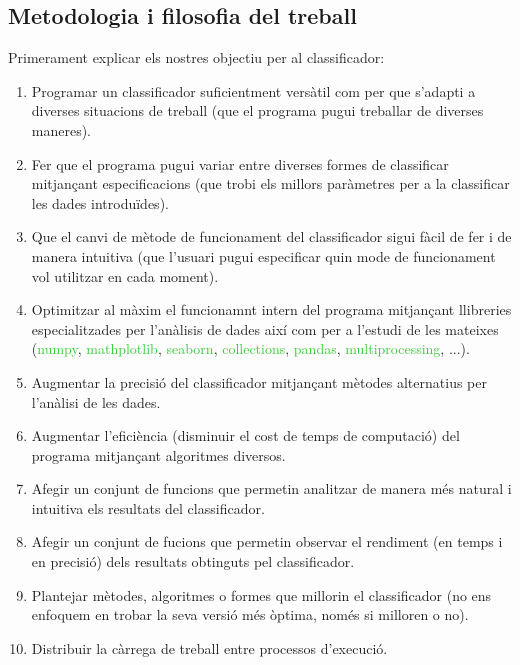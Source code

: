 \documentclass[a4paper, 11pt]{article}
\begin{document}
\subsection{Metodologia i filosofia del treball}
Primerament explicar els nostres objectiu per al classificador:
\begin{enumerate}
    \item Programar un classificador suficientment versàtil com per que s'adapti a diverses situacions de treball (que el programa pugui treballar de diverses maneres).
    \item Fer que el programa pugui variar entre diverses formes de classificar mitjançant especificacions (que trobi els millors paràmetres per a la classificar les dades introduïdes).
    \item Que el canvi de mètode de funcionament del classificador sigui fàcil de fer i de manera intuitiva (que l'usuari pugui especificar quin mode de funcionament vol utilitzar en cada moment).
    \item Optimitzar al màxim el funcionamnt intern del programa mitjançant llibreries especialitzades per l'anàlisis de dades així com per a l'estudi de les mateixes (\textcolor{LimeGreen}{numpy},  \textcolor{LimeGreen}{mathplotlib}, \textcolor{LimeGreen}{seaborn}, \textcolor{LimeGreen}{collections}, \textcolor{LimeGreen}{pandas}, \textcolor{LimeGreen}{multiprocessing}, ...).
    \item Augmentar la precisió del classificador mitjançant mètodes alternatius per l'anàlisi de les dades.
    \item Augmentar l'eficiència (disminuir el cost de temps de computació) del programa mitjançant algoritmes diversos.
    \item Afegir un conjunt de funcions que permetin analitzar de manera més natural i intuitiva els resultats del classificador.
    \item Afegir un conjunt de fucions que permetin observar el rendiment (en temps i en precisió) dels resultats obtinguts pel classificador.
    \item Plantejar mètodes, algoritmes o formes que millorin el classificador (no ens enfoquem en trobar la seva versió més òptima, només si milloren o no).
    \item Distribuir la càrrega de treball entre processos d'execució.
\end{enumerate}
\newpage
\end{document}
